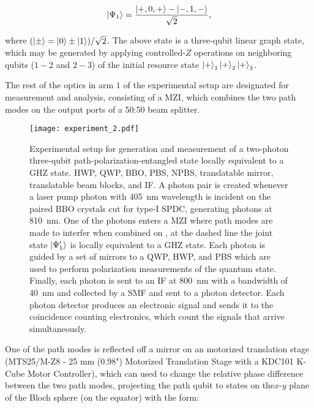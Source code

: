 \begin{align}
	\ket{\Psi_1} = \frac{\ket{+, 0, +} - \ket{-, 1, -}}{\sqrt{2}},
\end{align}

\noindent
where $(\ket{\pm} = \ket{0}\pm\ket{1})/\sqrt{2}$. The above state is a three-qubit linear graph state, which may be generated by applying controlled-$Z$ operations on neighboring qubits ($1-2$ and $2-3$) of the initial resource state $\ket{+}_1\ket{+}_2\ket{+}_3$.

\bigskip
\noindent
The rest of the optics in arm $1$ of the experimental setup are designated for measurement and analysis, consisting of a \acs{MZI}, which combines the two path modes on the output ports of a 50:50 beam splitter. 

\clearpage
\begin{figure*}[t!]
  \centering
  \texttt{[image: experiment\_2.pdf]}%
	\caption[Experimental setup for generation and measurement of a two-photon three-qubit path-polarization-entangled state locally equivalent to a \acs{GHZ} state.]{Experimental setup for generation and measurement of a two-photon three-qubit path-polarization-entangled state locally equivalent to a \acs{GHZ} state.  \gls{HWP}, \gls{QWP}, \gls{BBO}, \gls{PBS}, \gls{NPBS}, translatable mirror,  translatable beam blocks, and \gls{IF}. A photon pair is created whenever a laser pump photon with \SI{405}{nm} wavelength is incident on the paired \acs{BBO} crystals cut for type-I \acs{SPDC}, generating photons at \SI{810}{nm}. One of the photons enters a \acs{MZI} where path modes are made to interfer when combined on , at the dashed line the joint state $\ket{\Psi'_1}$ is locally equivalent to a \acs{GHZ} state. Each photon is guided by a set of mirrors to a \acs{QWP}, \acs{HWP}, and \acs{PBS} which are used to perform polarization measurements of the quantum state. Finally, each photon is sent to an \acs{IF} at \SI{800}{nm} with a bandwidth of \SI{40}{nm} and collected by a \gls{SMF} and sent to a photon detector. Each photon detector produces an electronic signal and sends it to the coincidence counting electronics, which count the signals that arrive simultaneously.}
\end{figure*}


\noindent
One of the path modes is reflected off a mirror on an motorized translation stage (MTS25/M-Z8 - 25 mm (0.98") Motorized Translation Stage with a KDC101 K-Cube Motor Controller), which can used to change the relative phase difference between the two path modes, projecting the path qubit to states on the$x$-$y$ plane of the Bloch sphere (on the equator) with the form:

